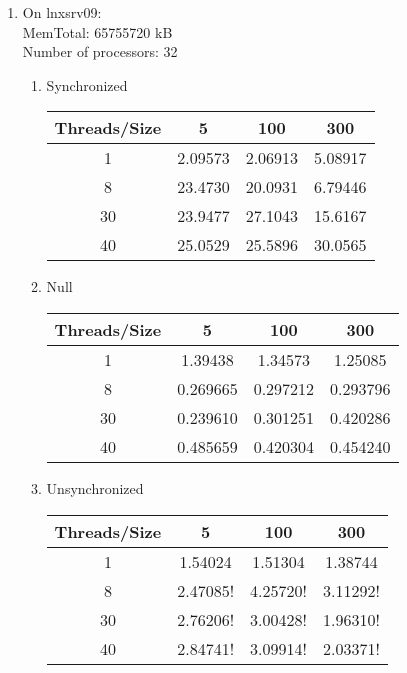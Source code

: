 \documentclass[letterpaper,twocolumn,10pt]{article}
\begin{document}
\begin{enumerate}
  \item   
  On lnxsrv09: \\
  MemTotal:       65755720 kB \\
  Number of processors: 32 \\
  \begin{enumerate}
    \item 
    Synchronized
    \begin{center}
      \begin{tabular}{|c|c|c|c|}
      \hline
        Threads/Size & 5 & 100 & 300 \\
      \hline 1 & 2.09573 & 2.06913 & 5.08917 \\
      \hline 8 & 23.4730 & 20.0931 & 6.79446 \\
      \hline 30 & 23.9477 & 27.1043 & 15.6167 \\
      \hline 40 & 25.0529 & 25.5896 & 30.0565 \\
      \hline
      \end{tabular}
    \end{center}
    \item 
    Null
    \begin{center}
      \begin{tabular}{|c|c|c|c|}
      \hline
        Threads/Size & 5 & 100 & 300 \\
      \hline 1 & 1.39438 & 1.34573 & 1.25085 \\
      \hline 8 & 0.269665 & 0.297212 & 0.293796 \\
      \hline 30 & 0.239610 & 0.301251 & 0.420286 \\
      \hline 40 & 0.485659 & 0.420304 & 0.454240 \\
      \hline
      \end{tabular}
    \end{center}
    \item 
    Unsynchronized
    \begin{center}
      \begin{tabular}{|c|c|c|c|}
      \hline
        Threads/Size & 5 & 100 & 300 \\
      \hline 1 & 1.54024 & 1.51304 & 1.38744 \\
      \hline 8 & 2.47085! & 4.25720! & 3.11292! \\
      \hline 30 & 2.76206! & 3.00428! & 1.96310! \\
      \hline 40 & 2.84741! & 3.09914! & 2.03371! \\
      \hline
      \end{tabular}
    \end{center}

\end{enumerate}
\end{enumerate}
\end{document}
